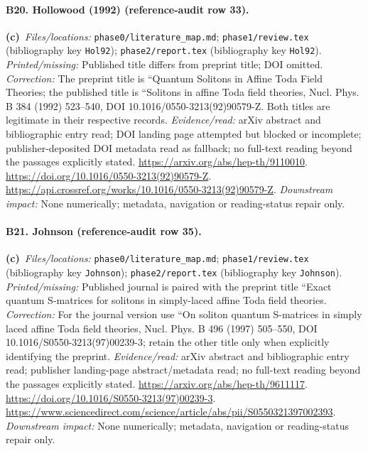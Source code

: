 \documentclass[11pt,a4paper]{article}
\newcommand{\C}{\textbf{(c)}\ }
\newcommand{\file}[1]{\nolinkurl{#1}}
\begin{document}
\paragraph{B20. Hollowood (1992) (reference-audit row 33).}
\C \textit{Files/locations:} \file{phase0/literature_map.md}; \file{phase1/review.tex} (bibliography key \file{Hol92}); \file{phase2/report.tex} (bibliography key \file{Hol92}).
\textit{Printed/missing:} Published title differs from preprint title; DOI omitted.
\textit{Correction:} The preprint title is ``Quantum Solitons in Affine Toda Field Theories; the published title is ``Solitons in affine Toda field theories, Nucl. Phys. B 384 (1992) 523--540, DOI 10.1016/0550-3213(92)90579-Z. Both titles are legitimate in their respective records.
\textit{Evidence/read:} arXiv abstract and bibliographic entry read; DOI landing page attempted but blocked or incomplete; publisher-deposited DOI metadata read as fallback; no full-text reading beyond the passages explicitly stated.
\url{https://arxiv.org/abs/hep-th/9110010}.
\url{https://doi.org/10.1016/0550-3213(92)90579-Z}.
\url{https://api.crossref.org/works/10.1016/0550-3213(92)90579-Z}.
\textit{Downstream impact:} None numerically; metadata, navigation or reading-status repair only.
\paragraph{B21. Johnson (reference-audit row 35).}
\C \textit{Files/locations:} \file{phase0/literature_map.md}; \file{phase1/review.tex} (bibliography key \file{Johnson}); \file{phase2/report.tex} (bibliography key \file{Johnson}).
\textit{Printed/missing:} Published journal is paired with the preprint title ``Exact quantum S-matrices for solitons in simply-laced affine Toda field theories.
\textit{Correction:} For the journal version use ``On soliton quantum S-matrices in simply laced affine Toda field theories, Nucl. Phys. B 496 (1997) 505--550, DOI 10.1016/S0550-3213(97)00239-3; retain the other title only when explicitly identifying the preprint.
\textit{Evidence/read:} arXiv abstract and bibliographic entry read; publisher landing-page abstract/metadata read; no full-text reading beyond the passages explicitly stated.
\url{https://arxiv.org/abs/hep-th/9611117}.
\url{https://doi.org/10.1016/S0550-3213(97)00239-3}.
\url{https://www.sciencedirect.com/science/article/abs/pii/S0550321397002393}.
\textit{Downstream impact:} None numerically; metadata, navigation or reading-status repair only.
\end{document}
